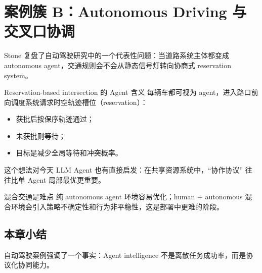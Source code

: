 \section{案例簇 B：Autonomous Driving 与交叉口协调}

Stone 复盘了自动驾驶研究中的一个代表性问题：当道路系统主体都变成 autonomous agent，交通规则会不会从静态信号灯转向协商式 reservation system。

\begin{knowledgebox}{Reservation-based intersection 的 Agent 含义}
每辆车都可视为 agent，进入路口前向调度系统请求时空轨迹槽位（reservation）：
\begin{itemize}
    \item 获批后按保序轨迹通过；
    \item 未获批则等待；
    \item 目标是减少全局等待和冲突概率。
\end{itemize}
\end{knowledgebox}

这个想法对今天 LLM Agent 也有直接启发：在共享资源系统中，``协作协议'' 往往比单 Agent 局部最优更重要。

\begin{warningbox}{混合交通是难点}
纯 autonomous agent 环境容易优化；human + autonomous 混合环境会引入策略不确定性和行为非平稳性，这是部署中更难的阶段。
\end{warningbox}

\subsection{本章小结}
自动驾驶案例强调了一个事实：Agent intelligence 不是离散任务成功率，而是协议化协同能力。

